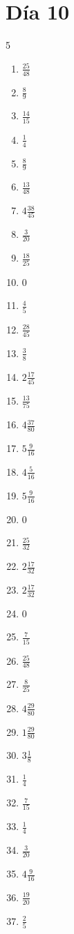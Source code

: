\documentclass[12pt]{article}
\begin{document}
\section*{Día 10}
\begin{multicols}{5}\begin{enumerate}
\item $ \frac{25}{48} $
\item $ \frac{8}{9} $
\item $ \frac{14}{15} $
\item $ \frac{1}{4} $
\item $ \frac{8}{9} $
\item $ \frac{13}{48} $
\item $ 4 \frac{38}{45} $
\item $ \frac{3}{20} $
\item $ \frac{18}{25} $
\item $ 0 $
\item $ \frac{4}{5} $
\item $ \frac{28}{45} $
\item $ \frac{3}{8} $
\item $ 2 \frac{17}{45} $
\item $ \frac{13}{75} $
\item $ 4 \frac{37}{80} $
\item $ 5 \frac{9}{16} $
\item $ 4 \frac{5}{16} $
\item $ 5 \frac{9}{16} $
\item $ 0 $
\item $ \frac{25}{32} $
\item $ 2 \frac{17}{32} $
\item $ 2 \frac{17}{32} $
\item $ 0 $
\item $ \frac{7}{15} $
\item $ \frac{25}{48} $
\item $ \frac{8}{25} $
\item $ 4 \frac{29}{80} $
\item $ 1 \frac{29}{80} $
\item $ 3 \frac{1}{8} $
\item $ \frac{1}{4} $
\item $ \frac{7}{15} $
\item $ \frac{1}{4} $
\item $ \frac{3}{20} $
\item $ 4 \frac{9}{16} $
\item $ \frac{19}{20} $
\item $ \frac{2}{5} $

\end{enumerate}
\end{multicols}
\end{document}
